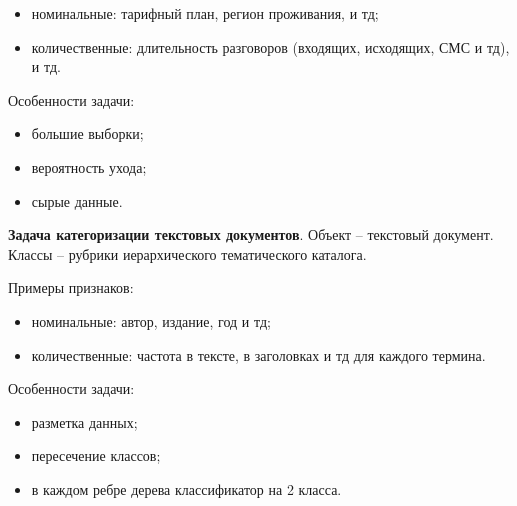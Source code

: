\begin{multicols}{2}
\begin{itemize}
      \item номинальные: тарифный план, регион проживания, и тд;
      \item количественные: длительность разговоров (входящих, исходящих, СМС и тд), и тд.
    \end{itemize}
    Особенности задачи:
    \begin{itemize}
      \item большие выборки;
      \item вероятность ухода;
      \item сырые данные.
    \end{itemize}
    \bigskip\par 
    \textbf{Задача категоризации текстовых документов}. Объект -- текстовый документ. Классы -- рубрики иерархического тематического каталога.
    \par
    Примеры признаков:
    \begin{itemize}
      \item номинальные: автор, издание, год и тд;
      \item количественные: частота в тексте, в заголовках и тд для каждого термина.
    \end{itemize}
    Особенности задачи:
    \begin{itemize}
      \item разметка данных;
      \item пересечение классов;
      \item в каждом ребре дерева классификатор на 2 класса.
    \end{itemize}

\end{multicols}
